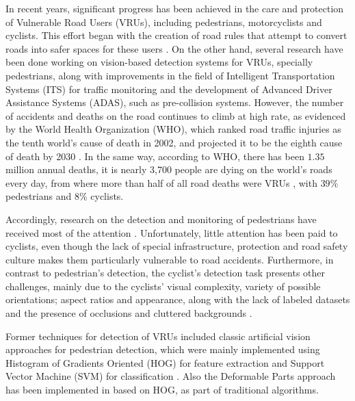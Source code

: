 \documentclass[journal]{IEEEtran}
\begin{document}
In recent years, significant progress has been achieved in the care and protection of Vulnerable Road Users (VRUs), including pedestrians, motorcyclists and cyclists. This effort began with the creation of road rules that attempt to convert roads into safer spaces for these users \cite{WorldHealthOrganization2018}. On the other hand, several research have been done working on vision-based detection systems for VRUs, specially pedestrians, along with improvements in the field of Intelligent Transportation Systems (ITS) for traffic monitoring and the development of Advanced Driver Assistance Systems (ADAS), such as pre-collision systems. 
However, the number of accidents and deaths on the road continues to climb at high rate, as evidenced by the World Health Organization (WHO), which ranked road traffic injuries as the tenth world's cause of death in 2002, and projected it to be the eighth cause of death by 2030 \cite{WHOProjections}. In the same way, according to WHO, there has been $1.35$ million annual deaths, it is nearly 3,700 people are dying on the world's roads every day, from where more than half of all road deaths were VRUs \cite{WorldHealthOrganization2018}, with $39\%$ pedestrians and $8\%$ cyclists. 

Accordingly, research on the detection and monitoring of pedestrians have received most of the attention \cite{HOGhuman2005,PedestrianDetec2012,HOGhuma2013,ObjectDetect2009,PedestrianDetect2013,ObjectDetec2014,lan2018pedestrian,chen2019thermal,heo2019estimation}. Unfortunately, little attention has been paid to cyclists, even though the lack of special infrastructure, protection and road safety culture makes them particularly vulnerable to road accidents. Furthermore, in contrast to pedestrian's detection, the cyclist's detection task presents other challenges, mainly due to the cyclists' visual complexity, variety of possible orientations; aspect ratios and appearance, along with the lack of labeled datasets \cite{kang2019test} and the presence of occlusions and cluttered backgrounds \cite{UnifiedCyclist2017,BenchmarkCylistDetect2016}.

Former techniques for detection of VRUs included classic artificial vision approaches for pedestrian detection, which were mainly implemented using Histogram of Gradients Oriented (HOG) for feature extraction and Support Vector Machine (SVM) for classification \cite{HOGhuman2005,PedestrianDetec2012,HOGhuma2013}. Also the Deformable Parts approach has been implemented in \cite{ObjectDetect2009} based on HOG, as part of traditional algorithms. 
\end{document}
